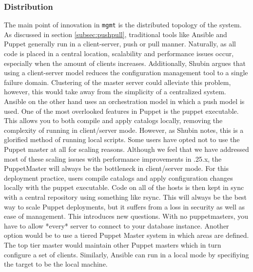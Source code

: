 \subsubsection{Distribution}
The main point of innovation in \texttt{mgmt} is the distributed topology of the system. As discussed in section \ref{subsec:pushpull}, traditional tools like Ansible and Puppet generally run in a client-server, push or pull manner. Naturally, as all code is placed in a central location, scalability and performance issues occur, especially when the amount of clients increases. Additionally, Shubin argues that using a client-server model reduces the configuration management tool to a single failure domain. Clustering of the master server could alleviate this problem, however, this would take away from the simplicity of a centralized system. Ansible on the other hand uses an orchestration model in which a push model is used. One of the most overlooked features in Puppet is the puppet executable. This allows you to both compile and apply catalogs locally, removing the complexity of running in client/server mode. However, as Shubin notes, this is a glorified method of running local scripts. Some users have opted not to use the Puppet master at all for scaling reasons. Although we feel that we have addressed most of these scaling issues with performance improvements in .25.x, the PuppetMaster will always be the bottleneck in client/server mode. For this deployment practice, users compile catalogs and apply configuration changes locally with the puppet executable. Code on all of the hosts is then kept in sync with a central repository using something like rsync. This will always be the best way to scale Puppet deployments, but it suffers from a loss in security as well as ease of management. This introduces new questions. With no puppetmasters, you have to allow *every* server to connect to your database instance. Another option would be to use a tiered Puppet Master system in which areas are defined. The top tier master would maintain other Puppet masters which in turn configure a set of clients. Similarly, Ansible can run in a local mode by specifiying the target to be the local machine. 

